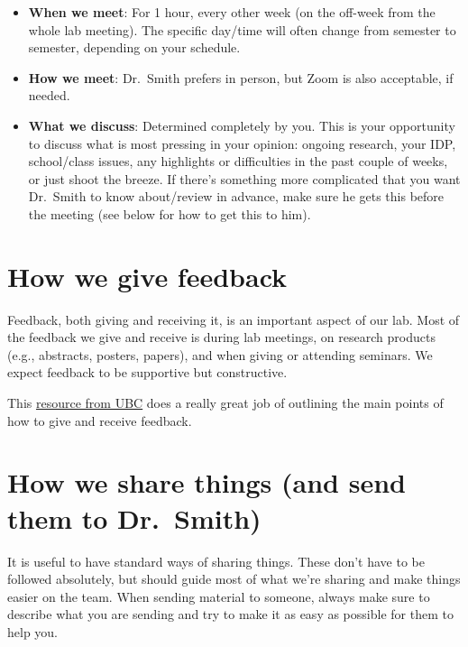 \documentclass[
  letterpaper,
  DIV=11,
  numbers=noendperiod]{scrreprt}
\begin{document}
\begin{itemize}
\item
  \textbf{When we meet}: For 1 hour, every other week (on the off-week
  from the whole lab meeting). The specific day/time will often change
  from semester to semester, depending on your schedule.
\item
  \textbf{How we meet}: Dr.~Smith prefers in person, but Zoom is also
  acceptable, if needed.
\item
  \textbf{What we discuss}: Determined completely by you. This is your
  opportunity to discuss what is most pressing in your opinion: ongoing
  research, your IDP, school/class issues, any highlights or
  difficulties in the past couple of weeks, or just shoot the breeze. If
  there's something more complicated that you want Dr.~Smith to know
  about/review in advance, make sure he gets this before the meeting
  (see below for how to get this to him).
\end{itemize}

\hypertarget{how-we-give-feedback}{%
\section{How we give feedback}\label{how-we-give-feedback}}

Feedback, both giving and receiving it, is an important aspect of our
lab. Most of the feedback we give and receive is during lab meetings, on
research products (e.g., abstracts, posters, papers), and when giving or
attending seminars. We expect feedback to be supportive but
constructive.

This
\href{https://scwrl.ubc.ca/student-resources/learning-strategies-for-communicating-science/how-to-give-and-receive-effective-feedback/}{resource
from UBC} does a really great job of outlining the main points of how to
give and receive feedback.

\hypertarget{how-we-share-things-and-send-them-to-dr.-smith}{%
\section{How we share things (and send them to
Dr.~Smith)}\label{how-we-share-things-and-send-them-to-dr.-smith}}

It is useful to have standard ways of sharing things. These don't have
to be followed absolutely, but should guide most of what we're sharing
and make things easier on the team. When sending material to someone,
always make sure to describe what you are sending and try to make it as
easy as possible for them to help you.
\end{document}
